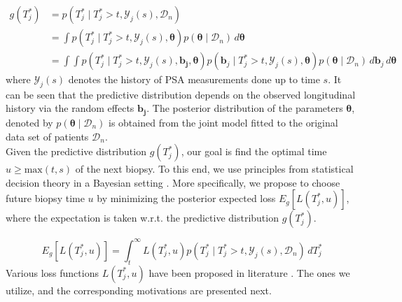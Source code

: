 \begin{equation}
\label{eq : dyn_dist_fail_time}
\begin{split}
g(T^*_j) &= p(T^*_j \mid T^*_j > t, \mathcal{Y}_j(s), \mathcal{D}_n)\\
&= \int p(T^*_j \mid T^*_j > t, \mathcal{Y}_j(s), \boldsymbol{\theta}) p(\boldsymbol{\theta} \mid \mathcal{D}_n) \,d\boldsymbol{\theta}\\
&= \int \int p(T^*_j \mid T^*_j > t, \mathcal{Y}_j(s), \boldsymbol{b_j}, \boldsymbol{\theta}) p(\boldsymbol{b}_j \mid T^*_j>t, \mathcal{Y}_j(s), \boldsymbol{\theta})p(\boldsymbol{\theta} \mid \mathcal{D}_n) \,d\boldsymbol{b}_j \,d\boldsymbol{\theta}
\end{split}
\end{equation}
where $\mathcal{Y}_j(s)$ denotes the history of PSA measurements done up to time $s$. It can be seen that the predictive distribution depends on the observed longitudinal history via the random effects $\boldsymbol{b_j}$. The posterior distribution of the parameters $\boldsymbol{\theta}$, denoted by $p(\boldsymbol{\theta} \mid \mathcal{D}_n)$ is obtained from the joint model fitted to the original data set of patients $\mathcal{D}_n$.\\

Given the predictive distribution $g(T^*_j)$, our goal is find the optimal time $u \geq \text{max}(t,s)$ of the next biopsy. To this end, we use principles from statistical decision theory in a Bayesian setting \citep{bergerDecisionTheory,robertBayesianChoice}. More specifically, we propose to choose future biopsy time $u$ by minimizing the posterior expected loss $E_g[L(T^*_j, u)]$, where the expectation is taken w.r.t. the predictive distribution $g(T^*_j)$. 

\begin{equation*}
E_g[L(T^*_j, u)] = \int_t^\infty L(T^*_j, u) p(T^*_j \mid T^*_j > t, \mathcal{Y}_j(s), \mathcal{D}_n) \,dT^*_j
\end{equation*}
Various loss functions $L(T^*_j, u)$ have been proposed in literature \citep{robertBayesianChoice}. The ones we utilize, and the corresponding motivations are presented next.

